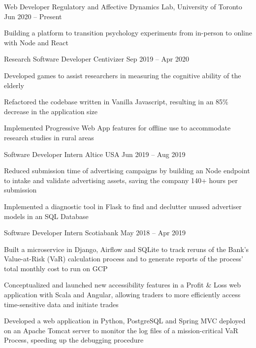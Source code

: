 \begin{cventries}
  \cventry
    {Web Developer}
    {Regulatory and Affective Dynamics Lab, University of Toronto}
    {}
    {Jun 2020 -- Present}
    {}
    {
      \begin{cvitems}
        \item {Building a platform to transition psychology experiments from in-person to online with Node and React}
      \end{cvitems}
    }
  \cventry
    {Research Software Developer}
    {Centivizer}
    {}
    {Sep 2019 -- Apr 2020}
    {}
    {
      \begin{cvitems}
        \item {Developed games to assist researchers in measuring the cognitive ability of the elderly}
        \item {Refactored the codebase written in Vanilla Javascript, resulting in an 85\% decrease in the application size}
        \item {Implemented Progressive Web App features for offline use to accommodate research studies in rural areas}
      \end{cvitems}
    }
  \cventry
    {Software Developer Intern}
    {Altice USA}
    {}
    {Jun 2019 -- Aug 2019}
    {}
    {
    \begin{cvitems}
      \item {Reduced submission time of advertising campaigns by building an Node endpoint to intake and validate advertising assets, saving the company 140+ hours per submission}
      \item {Implemented a diagnostic tool in Flask to find and declutter unused advertiser models in an SQL Database}
    \end{cvitems}
    }
  \cventry
    {Software Developer Intern}
    {Scotiabank}
    {}
    {May 2018 -- Apr 2019}
    {}
    {
      \begin{cvitems}
        \item {Built a microservice in Django, Airflow and SQLite to track reruns of the Bank's Value-at-Risk (VaR) calculation process and to generate reports of the process' total monthly cost to run on GCP}
        \item {Conceptualized and launched new accessibility features in a Profit \& Loss web application with Scala and Angular, allowing traders to more efficiently access time-sensitive data and initiate trades}
        \item {Developed a web application in Python, PostgreSQL and Spring MVC deployed on an Apache Tomcat server to monitor the log files of a mission-critical VaR Process, speeding up the debugging procedure}
      \end{cvitems}
    }
  

\end{cventries}
